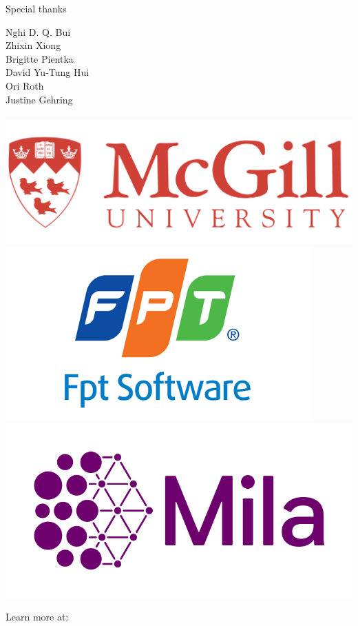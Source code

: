 \documentclass{beamer}
\begin{document}
\begin{frame}{Special thanks}
  \begin{center}
    \LARGE{
      Nghi D. Q. Bui\\
      Zhixin Xiong\\
      Brigitte Pientka\\
      David Yu-Tung Hui\\
      Ori Roth\\
      Justine Gehring\\
      \phantom{}\\
    }
    \href{https://cs.mcgill.ca}{\includegraphics[scale=0.06]{../figures/mcgill_logo.png}}
    \href{https://www.fpt-software.com}{\includegraphics[scale=0.15]{../figures/fpt_logo.png}}
    \href{https://mila.quebec}{\includegraphics[scale=0.1]{../figures/mila_logo.png}}
  \end{center}
\end{frame}

\begin{frame}
  \begin{center}
    \huge{Learn more at: \\~\\
    \href{https://tidyparse.github.io}{\color{blue}{https://tidyparse.github.io}}}
  \end{center}
\end{frame}
\end{document}
